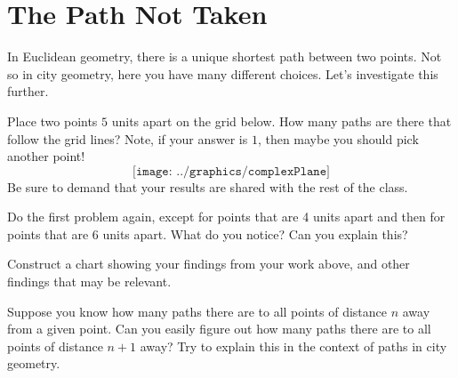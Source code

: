 \newpage
\section{The Path Not Taken}
                                  

In Euclidean geometry, there is a unique shortest path between two
points. Not so in city geometry, here you have many different
choices. Let's investigate this further.


\begin{prob} 
Place two points $5$ units apart on the grid below. How many paths are
there that follow the grid lines? Note, if your answer is $1$, then
maybe you should pick another point!
\[
\texttt{[image: ../graphics/complexPlane]}
\]
Be sure to demand that your results are shared with the rest of the
class.
\end{prob}

\begin{prob}
Do the first problem again, except for points that are 4 units apart
and then for points that are 6 units apart. What do you notice? Can
you explain this?
\end{prob}

\begin{prob}
Construct a chart showing your findings from your work above, and
other findings that may be relevant.
\end{prob}

\begin{prob}
Suppose you know how many paths there are to all points of distance
$n$ away from a given point. Can you easily figure out how many paths
there are to all points of distance $n+1$ away? Try to explain this in
the context of paths in city geometry.
\end{prob}
